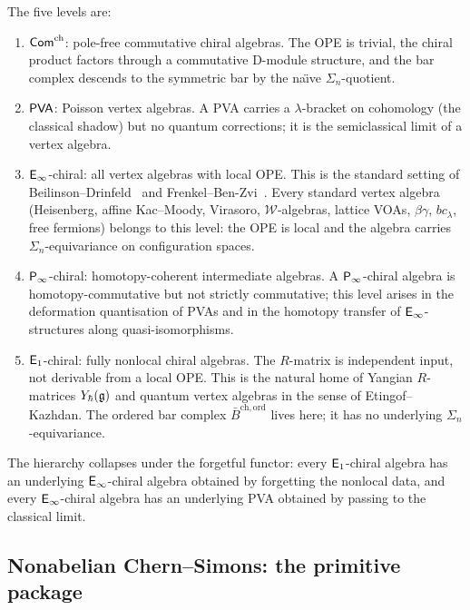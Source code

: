 \begin{remark}
\label{rem:v2-algebraic-hierarchy-levels}
The five levels are:
\begin{enumerate}[label=\textup{(\roman*)}]
\item $\mathsf{Com}^{\mathrm{ch}}$: pole-free commutative chiral algebras.
 The OPE is trivial, the chiral product factors through
 a commutative D-module structure, and the bar complex
 descends to the symmetric bar by the na\"{\i}ve
 $\Sigma_n$-quotient.

\item $\mathsf{PVA}$: Poisson vertex algebras. A PVA carries a
 $\lambda$-bracket on cohomology (the classical shadow) but
 no quantum corrections; it is the semiclassical limit of a
 vertex algebra.

\item $\mathsf{E}_{\infty}$-chiral: all vertex algebras with local OPE.
 This is the standard setting of Beilinson--Drinfeld~\cite{BD04}
 and Frenkel--Ben-Zvi~\cite{FBZ04}. Every standard vertex
 algebra (Heisenberg, affine Kac--Moody, Virasoro,
 $\mathcal{W}$-algebras, lattice VOAs, $\beta\gamma$,
 $bc_\lambda$, free fermions) belongs to this level: the OPE
 is local and the algebra carries $\Sigma_n$-equivariance
 on configuration spaces.

\item $\mathsf{P}_{\infty}$-chiral: homotopy-coherent intermediate algebras.
 A $\mathsf{P}_{\infty}$-chiral algebra is homotopy-commutative but not
 strictly commutative; this level arises in the deformation
 quantisation of PVAs and in the homotopy transfer of
 $\mathsf{E}_{\infty}$-structures along quasi-isomorphisms.

\item $\mathsf{E}_1$-chiral: fully nonlocal chiral algebras.
 The $R$-matrix is independent input, not derivable from a
 local OPE. This is the natural home of Yangian $R$-matrices
 $Y_\hbar(\mathfrak{g})$ and quantum vertex algebras in the sense of
 Etingof--Kazhdan. The ordered bar complex
 $\bar{B}^{\mathrm{ch,ord}}$ lives here; it has no
 underlying $\Sigma_n$-equivariance.
\end{enumerate}
The hierarchy collapses under the forgetful functor: every
$\mathsf{E}_1$-chiral algebra has an underlying $\mathsf{E}_{\infty}$-chiral
algebra obtained by forgetting the nonlocal data, and every
$\mathsf{E}_{\infty}$-chiral algebra has an underlying PVA obtained by
passing to the classical limit.
\end{remark}

\subsection{Nonabelian Chern--Simons: the primitive package}
\label{subsec:cs-nonabelian-primitive-package}

